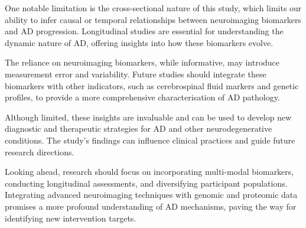 \documentclass[10pt]{article}
\begin{document}
\begin{sloppypar}
  One notable limitation is the cross-sectional nature of this study, which limits our ability to infer causal or temporal relationships between neuroimaging biomarkers and AD progression. Longitudinal studies are essential for understanding the dynamic nature of AD, offering insights into how these biomarkers evolve.

  The reliance on neuroimaging biomarkers, while informative, may introduce measurement error and variability. Future studies should integrate these biomarkers with other indicators, such as cerebrospinal fluid markers and genetic profiles, to provide a more comprehensive characterisation of AD pathology.

  Although limited, these insights are invaluable and can be used to develop new diagnostic and therapeutic strategies for AD and other neurodegenerative conditions. The study’s findings can influence clinical practices and guide future research directions.

  Looking ahead, research should focus on incorporating multi-modal biomarkers, conducting longitudinal assessments, and diversifying participant populations. Integrating advanced neuroimaging techniques with genomic and proteomic data promises a more profound understanding of AD mechanisms, paving the way for identifying new intervention targets.

  \pagebreak
  \singlespacing %
  
  

\end{sloppypar}
\end{document}
